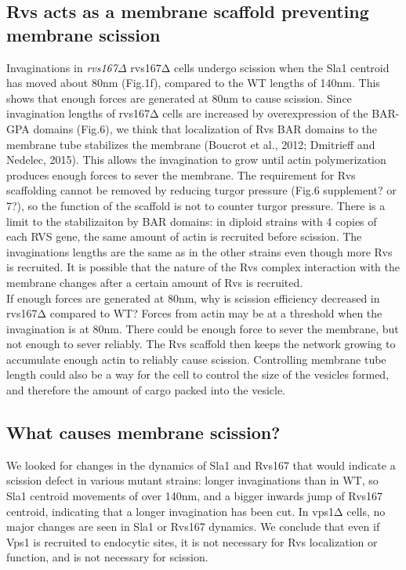\documentclass[9pt,lineno]{elife}
\begin{document}
\subsection{Rvs acts as a membrane scaffold preventing membrane scission}
Invaginations in \textit{rvs167$\Delta$} rvs167Δ cells undergo scission when the Sla1 centroid has moved about 80nm (Fig.1f), compared to the WT lengths of 140nm. This shows that enough forces are generated at 80nm to cause scission. Since invagination lengths of rvs167Δ cells are increased by overexpression of the BAR-GPA domains (Fig.6), we think that localization of Rvs BAR domains to the membrane tube stabilizes the  membrane (Boucrot et al., 2012; Dmitrieff and Nedelec, 2015). This allows the invagination to grow until actin polymerization produces enough forces to sever the membrane. The requirement for Rvs scaffolding cannot be removed by reducing turgor pressure (Fig.6 supplement? or 7?),  so the function of the scaffold is not to counter turgor pressure. There is a limit to the stabilizaiton by BAR domains: in diploid strains with 4 copies of each RVS gene, the same amount of actin is recruited before scission. The invaginations lengths are the same as in the other strains even though more Rvs is recruited. It is possible that the nature of the Rvs complex interaction with the membrane changes after a certain amount of Rvs is recruited. 
~\\ 

If enough forces are generated at 80nm, why is scission efficiency decreased in rvs167Δ compared to WT? Forces from actin may be at a threshold when the invagination is at 80nm. There could be enough force to sever the membrane, but not enough to sever reliably. The Rvs scaffold then keeps the network growing to accumulate enough actin to reliably cause scission. Controlling membrane  tube length could also be a way for the cell to control the size of the vesicles formed, and therefore the amount of cargo packed into the vesicle. 

\subsection{What causes membrane scission?}
We looked for changes in the dynamics of Sla1 and Rvs167 that would indicate a scission defect in various mutant strains: longer invaginations than in WT, so Sla1 centroid movements of over 140nm, and a bigger inwards jump of Rvs167 centroid, indicating that a longer invagination has been cut. In vps1Δ cells, no major changes are seen in Sla1 or Rvs167 dynamics. We conclude that even if Vps1 is recruited to endocytic sites, it is not necessary for Rvs localization or function, and is not necessary for scission. 
\end{document}
